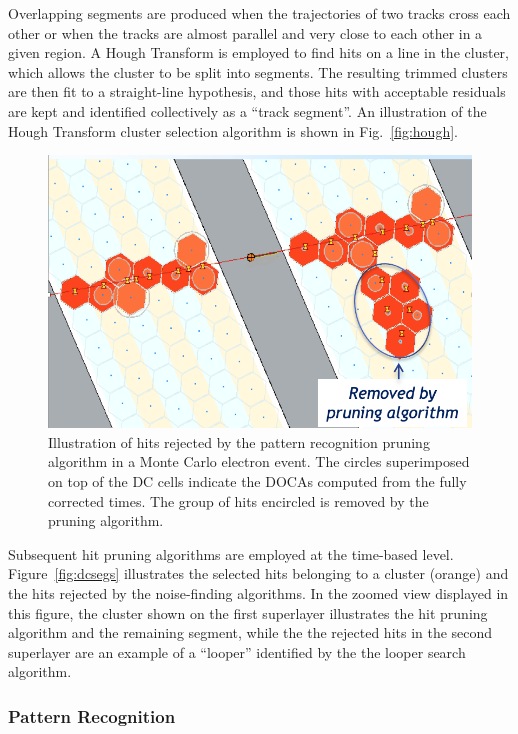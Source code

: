 Overlapping segments are produced when the trajectories of two tracks cross each other or when the tracks are
almost parallel and very close to each other in a given region. A Hough Transform is employed to find hits on a line
in the cluster, which allows the cluster to be split into segments.  The resulting trimmed clusters are then fit to a
straight-line hypothesis, and those hits with acceptable residuals are kept and identified collectively as a
``track segment''. An illustration of the Hough Transform cluster selection algorithm is shown in Fig.~\ref{fig:hough}.

\begin{figure}[t]
\centering
\includegraphics[width=0.9\columnwidth]{pics/dcPattern2.png}
\caption{Illustration of hits rejected by the pattern recognition pruning algorithm in a Monte Carlo electron
  event. The circles superimposed on top of the DC cells indicate the DOCAs computed from the fully corrected
  times. The group of hits encircled is removed by the pruning algorithm.}
\label{fig:strings}
\end{figure}

Subsequent hit pruning algorithms are employed at the time-based level. Figure~\ref{fig:dcsegs} illustrates the
selected hits belonging to a cluster (orange) and the hits rejected by the noise-finding algorithms. 
{\color{re}In the zoomed view displayed in this figure,
the cluster shown on the first superlayer illustrates the hit pruning algorithm and 
the remaining segment, while the the rejected hits in the second superlayer are an example of a ``looper'' identified 
by the the looper search algorithm.}
  
\subsubsection{Pattern Recognition}

